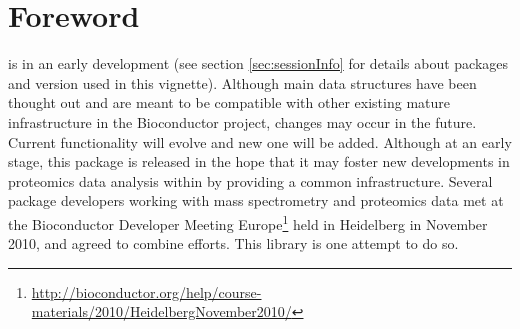 \section*{Foreword}

 is in an early development %
(see section \ref{sec:sessionInfo} for details about packages and version used in this vignette). 
Although main data structures have been thought out and are meant to be compatible with other existing 
mature infrastructure in the Bioconductor project, changes may occur in the future. 
Current functionality will evolve and new one will be added. 
Although at an early stage, this package is released in the hope that it may foster  
new developments in proteomics data analysis within \R by providing a common infrastructure. 
Several package developers working with mass spectrometry and proteomics data met at the 
Bioconductor Developer Meeting Europe\footnote{\url{http://bioconductor.org/help/course-materials/2010/HeidelbergNovember2010/}} 
held in Heidelberg in November 2010, and agreed to combine efforts. 
This library is one attempt to do so.

